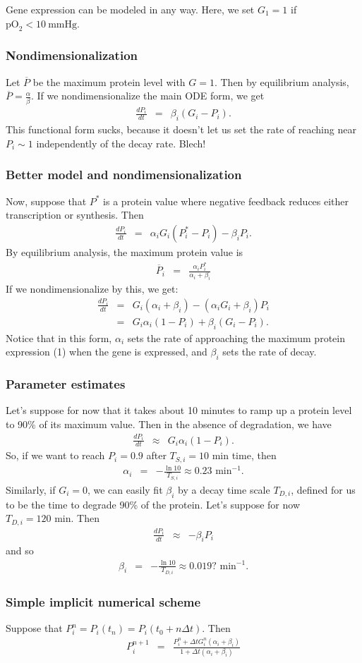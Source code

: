 \documentclass[12pt]{article}
\newcommand{\oxy}{  {\textrm{pO}_2} }
\newcommand{\mmHg}{\: \textrm{mmHg} }
\newcommand{\beqa}{\begin{eqnarray}}
\newcommand{\eeqa}{\end{eqnarray}}
\begin{document}
Gene expression can be modeled in any way. Here, we set $G_1 =1$ if $\oxy < 10 \mmHg$. 

\subsubsection{Nondimensionalization}
Let $\overline{P}$ be the maximum protein level with $G = 1$. Then by equilibrium analysis, 
$\overline{P} = \frac{\alpha}{\beta}$. If we nondimensionalize the main ODE form, we get 
\beqa
\frac{dP_i}{dt} & = & \beta_i \left( G_i - P_i \right). 
\eeqa
This functional form sucks, because it doesn't let us set the rate of reaching near $P_i \sim 1$ independently 
of the decay rate. Blech!

\subsubsection{Better model and nondimensionalization}
Now, suppose that $P^*$ is a protein value where negative feedback reduces either transcription or synthesis. Then 
\beqa
\frac{ dP_i }{dt } & = & \alpha_i G_i \left( P_i^* - P_i \right) - \beta_i P_i. 
\eeqa
By equilibrium analysis, the maximum protein value is 
\beqa
\overline{P}_i & =& 
\frac{\alpha_i P_i^*}{\alpha_i + \beta_i }
\eeqa
If we nondimensionalize by this, we get: 
\beqa
\frac{ dP_i }{dt} & = & 
G_i \left( \alpha_i + \beta_i \right) - \left( \alpha_i G_i + \beta_i \right) P_i \nonumber \\
& = & 
G_i \alpha_i \left( 1 - P_i \right) + \beta_i \left( G_i - P_i \right) . 
\eeqa
Notice that in this form, $\alpha_i$ sets the rate of approaching the maximum protein expression (1) 
when the gene is expressed, and $\beta_i$ sets the rate of decay. 

\subsubsection{Parameter estimates}
Let's suppose for now that it takes about 10 minutes to ramp up a protein level to 90\% of its 
maximum value. Then in the absence of degradation, we have 
\beqa
\frac{dP_i}{dt} & \approx & G_i \alpha_i \left( 1 - P_i \right). 
\eeqa
So, if we want to reach $P_i = 0.9$ after $T_{S,i} = 10 \textrm{ min}$ time, then 
\beqa
\alpha_i &  =&  -\frac{ \ln{10} }{ T_{S,i} } \approx 0.23  \textrm{ min}^{-1}. 
\eeqa
Similarly, if $G_i = 0$, we can easily fit $\beta_i$ by a decay time scale $T_{D,i}$, defined 
for us to be the time to degrade 90\% of the protein. Let's suppose for now $T_{D,i} = 120 \textrm{ min}$. 
Then 
\beqa
\frac{dP_i}{dt} & \approx & - \beta_i  P_i  
\eeqa
and so 
\beqa
\beta_i & = & -\frac{ \ln{10} }{ T_{D,i} } \approx 0.019 ? \textrm{ min}^{-1}. 
\eeqa

\subsubsection{Simple implicit numerical scheme}
Suppose that $P_i^n = P_i( t_n ) = P_i ( t_0 + n \Delta t)$. Then 
\beqa
P^{n+1}_i 
& = & 
\frac{ P_i^n + \Delta t G_i^n \left( \alpha_i + \beta_i \right) }{ 1 + \Delta t \left( \alpha_i + \beta_i \right)}
\eeqa
\end{document}
